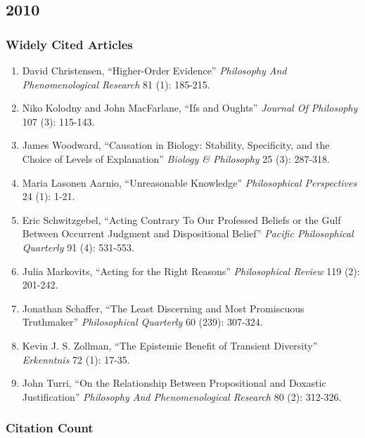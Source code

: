 \documentclass[
  10pt,
  letterpaper,
  DIV=11,
  numbers=noendperiod,
  twoside]{scrartcl}
\providecommand{\tightlist}{%
  \setlength{\itemsep}{0pt}\setlength{\parskip}{0pt}}\usepackage{longtable,booktabs,array}
\begin{document}
\newpage

\subsection{2010}\label{section-34}

\subsubsection*{Widely Cited Articles}\label{widely-cited-articles-34}

\begin{enumerate}
\def\labelenumi{\arabic{enumi}.}
\tightlist
\item
  David Christensen, ``Higher-Order Evidence'' \emph{Philosophy And
  Phenomenological Research} 81 (1): 185-215.
\item
  Niko Kolodny and John MacFarlane, ``Ifs and Oughts'' \emph{Journal Of
  Philosophy} 107 (3): 115-143.
\item
  James Woodward, ``Causation in Biology: Stability, Specificity, and
  the Choice of Levels of Explanation'' \emph{Biology \& Philosophy} 25
  (3): 287-318.
\item
  Maria Lasonen Aarnio, ``Unreasonable Knowledge'' \emph{Philosophical
  Perspectives} 24 (1): 1-21.
\item
  Eric Schwitzgebel, ``Acting Contrary To Our Professed Beliefs or the
  Gulf Between Occurrent Judgment and Dispositional Belief''
  \emph{Pacific Philosophical Quarterly} 91 (4): 531-553.
\item
  Julia Markovits, ``Acting for the Right Reasons'' \emph{Philosophical
  Review} 119 (2): 201-242.
\item
  Jonathan Schaffer, ``The Least Discerning and Most Promiscuous
  Truthmaker'' \emph{Philosophical Quarterly} 60 (239): 307-324.
\item
  Kevin J. S. Zollman, ``The Epistemic Benefit of Transient Diversity''
  \emph{Erkenntnis} 72 (1): 17-35.
\item
  John Turri, ``On the Relationship Between Propositional and Doxastic
  Justification'' \emph{Philosophy And Phenomenological Research} 80
  (2): 312-326.
\end{enumerate}

\subsubsection*{Citation Count}\label{citation-count-34}
\end{document}
